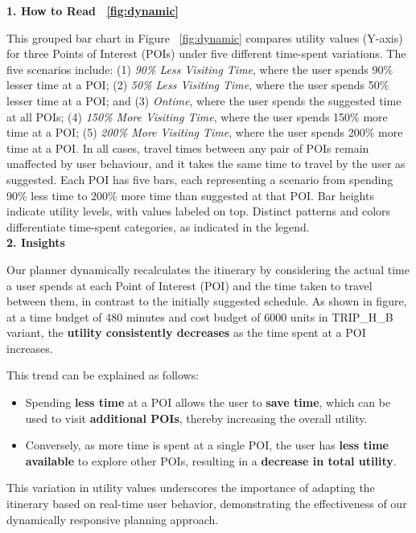 \noindent\textbf{1. How to Read ~\ref{fig:dynamic}}

This grouped bar chart in Figure ~\ref{fig:dynamic} compares utility values (Y-axis) for three Points of Interest (POIs) under five different time-spent variations. The five scenarios include: (1) \textit{90\% Less Visiting Time}, where the user spends 90\% lesser time at a POI; (2) \textit{50\% Less Visiting Time}, where the user spends 50\% lesser time at a POI; and (3) \textit{Ontime}, where the user spends the suggested time at all POIs; (4) \textit{150\% More Visiting Time}, where the user spends 150\% more time at a POI; (5) \textit{200\% More Visiting Time}, where the user spends 200\% more time at a POI. 
In all cases, travel times between any pair of POIs remain unaffected by user behaviour, and it takes the same time to travel by the user as suggested. Each POI has five bars, each representing a scenario from spending 90\% less time to 200\% more time than suggested at that POI. Bar heights indicate utility levels, with values labeled on top. Distinct patterns and colors differentiate time-spent categories, as indicated in the legend.\\

\noindent\textbf{2. Insights}

Our planner dynamically recalculates the itinerary by considering the actual time a user spends at each Point of Interest (POI) and the time taken to travel between them, in contrast to the initially suggested schedule.  As shown in figure, at a time budget of 480 minutes and cost budget of 6000 units in TRIP\_H\_B variant, the \textbf{utility consistently decreases} as the time spent at a POI increases.

This trend can be explained as follows:

\begin{itemize}
    \item Spending \textbf{less time} at a POI allows the user to \textbf{save time}, which can be used to visit \textbf{additional POIs}, thereby increasing the overall utility.
    \item Conversely, as more time is spent at a single POI, the user has \textbf{less time available} to explore other POIs, resulting in a \textbf{decrease in total utility}.
\end{itemize}

\noindenct This variation in utility values underscores the importance of adapting the itinerary based on real-time user behavior, demonstrating the effectiveness of our dynamically responsive planning approach.\\
 
